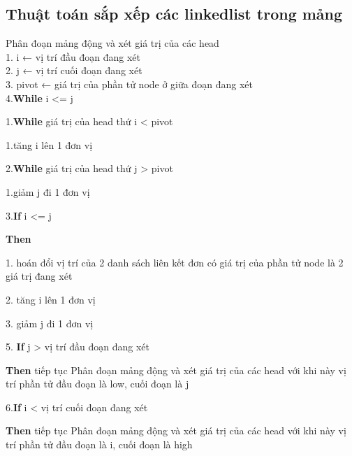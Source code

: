 \documentclass [14pt, a4paper]{report}
\begin{document}
\subsection{Thuật toán sắp xếp các linkedlist trong mảng}
Phân đoạn mảng động và xét giá trị của các head \\
1.  i ← vị trí đầu đoạn đang xét\\
2.  j ←  vị trí cuối đoạn đang xét\\
3.  pivot ← giá trị của phần tử node ở giữa đoạn đang xét\\
4.\textbf{While } i <= j
    
    
   \hspace{1cm}         1.\textbf{While}  giá trị của head thứ i < pivot
   
   
          \hspace{2cm}  		1.tăng i lên 1 đơn vị
          
          
     \hspace{1cm}       2.\textbf{While}  giá trị của head thứ j > pivot
     
     
              \hspace{2cm}  	1.giảm j đi 1 đơn vị
              
              
      \hspace{1cm}      3.\textbf{If}  i <= j
      
      
          \hspace{2cm}     		\textbf{Then }
          
          
  \hspace{3cm}  1.  hoán đổi vị trí của 2 danh sách liên kết đơn có giá trị của phần tử node là 2 giá trị đang xét
  
  
        \hspace{3cm}      			2.  tăng i lên 1 đơn vị
        
        
      \hspace{3cm}         		3.  giảm j đi 1 đơn vị
      
      
5. \textbf{If}  j > vị trí đầu đoạn đang xét


   \hspace{1cm}        	\textbf{Then} tiếp tục Phân đoạn mảng động và xét giá trị của các head với khi này vị trí phần tử đầu đoạn là low, cuối đoạn là j
   
 6.\textbf{If}  i < vị trí cuối đoạn đang xét
 
 
   \hspace{1cm}      	\textbf{Then}  tiếp tục Phân đoạn mảng động và xét giá trị của các head với khi này vị trí phần tử đầu đoạn là i, cuối đoạn là high
            
\end{document}
